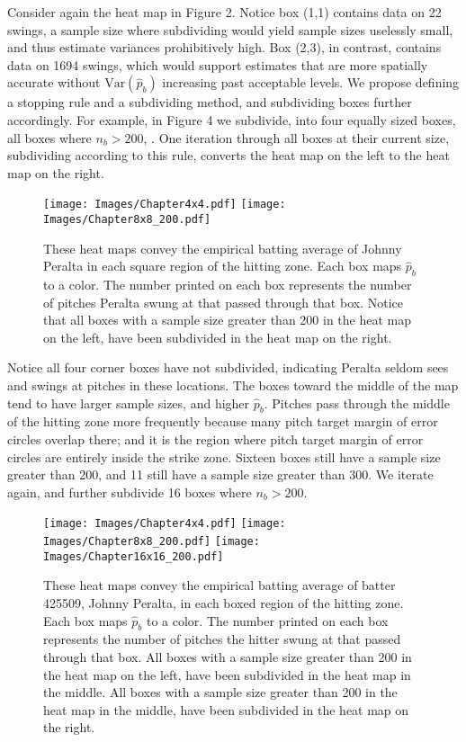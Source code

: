 Consider again the heat map in Figure 2. Notice box (1,1) contains data on 22 swings, a sample size where subdividing would yield sample sizes uselessly small, and thus estimate variances prohibitively high. Box (2,3), in contrast, contains data on 1694 swings, which would support estimates that are more spatially accurate without $\text{Var}(\hat{p}_{b})$ increasing past acceptable levels. We propose defining a stopping rule and a subdividing method, and subdividing boxes further accordingly. For example, in Figure 4 we subdivide, into four equally sized boxes, all boxes where $n_{b} > 200$, . One iteration through all boxes at their current size, subdividing according to this rule, converts the heat map on the left to the heat map on the right.
        \begin{figure}[H]
      	\centering
      	\texttt{[image: Images/Chapter4x4.pdf]} 
      	\texttt{[image: Images/Chapter8x8\_200.pdf]} 
      	\caption{These heat maps convey the empirical batting average of Johnny Peralta in each square region of the hitting zone. Each box maps $\hat{p}_{b}$ to a color. The number printed on each box represents the number of pitches Peralta swung at that passed through that box. Notice that all boxes with a sample size greater than 200 in the heat map on the left, have been subdivided in the heat map on the right.}
      	\end{figure} 
Notice all four corner boxes have not subdivided, indicating Peralta seldom sees and swings at pitches in these locations. The boxes toward the middle of the map tend to have larger sample sizes, and higher $\hat{p}_{b}$. Pitches pass through the middle of the hitting zone more frequently because many pitch target margin of error circles overlap there; and it is the region where pitch target margin of error circles are entirely inside the strike zone. Sixteen boxes still have a sample size greater than 200, and 11 still have a sample size greater than 300. We iterate again, and further subdivide 16 boxes where $n_{b} > 200$.
        \begin{figure}[H]
      	\centering
      	
      	\texttt{[image: Images/Chapter4x4.pdf]}
      	\texttt{[image: Images/Chapter8x8\_200.pdf]} 
      	\texttt{[image: Images/Chapter16x16\_200.pdf]} 
      	\caption{These heat maps convey the empirical batting average of batter 425509, Johnny Peralta, in each boxed region of the hitting zone. Each box maps $\hat{p}_{b}$ to a color. The number printed on each box represents the number of pitches the hitter swung at that passed through that box. All boxes with a sample size greater than 200 in the heat map on the left, have been subdivided in the heat map in the middle. All boxes with a sample size greater than 200 in the heat map in the middle, have been subdivided in the heat map on the right.}
      	\end{figure}

